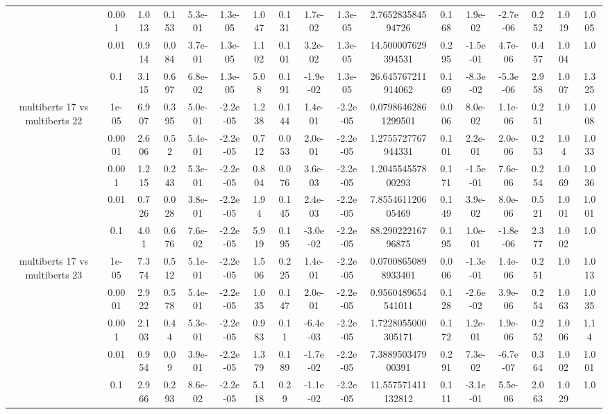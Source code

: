 \begin{tabular}{|c|c|c|c|c|c|c|c|c|c|c|c|c|c|c|c|c|}
 & 0.001 & 1.013 & 0.153 & 5.3e-01 & 1.3e-05 & 1.047 & 0.131 & 1.7e-02 & 1.3e-05 & 2.765283584594726 & 0.168 & 1.9e-02 & -2.7e-06 & 0.252 & 1.019 & 1.005 \\
 & 0.01 & 0.914 & 0.084 & 3.7e-01 & 1.3e-05 & 1.102 & 0.101 & 3.2e-02 & 1.3e-05 & 14.500007629394531 & 0.295 & -1.5e-01 & 4.7e-06 & 0.457 & 1.004 & 1.0 \\
 & 0.1 & 3.115 & 0.697 & 6.8e-02 & 1.3e-05 & 5.08 & 0.191 & -1.9e-02 & 1.3e-05 & 26.645767211914062 & 0.169 & -8.3e-02 & -5.3e-06 & 2.958 & 1.007 & 1.325 \\
\hline
\multirow{5}{*}{multiberts 17 vs multiberts 22} & 1e-05 & 6.907 & 0.395 & 5.0e-01 & -2.2e-05 & 1.238 & 0.144 & 1.4e-01 & -2.2e-05 & 0.07986462861299501 & 0.006 & 8.0e-02 & 1.1e-06 & 0.251 & 1.0 & 1.008 \\
 & 0.0001 & 2.606 & 0.52 & 5.4e-01 & -2.2e-05 & 0.712 & 0.053 & 2.0e-01 & -2.2e-05 & 1.2755727767944331 & 0.101 & 2.2e-01 & 2.0e-06 & 0.253 & 1.04 & 1.033 \\
 & 0.001 & 1.215 & 0.243 & 5.3e-01 & -2.2e-05 & 0.804 & 0.076 & 3.6e-03 & -2.2e-05 & 1.204554557800293 & 0.171 & -1.5e-01 & 7.6e-06 & 0.254 & 1.069 & 1.036 \\
 & 0.01 & 0.726 & 0.028 & 3.8e-01 & -2.2e-05 & 1.94 & 0.145 & 2.4e-03 & -2.2e-05 & 7.855461120605469 & 0.149 & 3.9e-02 & 8.0e-06 & 0.521 & 1.001 & 1.001 \\
 & 0.1 & 4.01 & 0.676 & 7.6e-02 & -2.2e-05 & 5.919 & 0.195 & -3.0e-02 & -2.2e-05 & 88.29022216796875 & 0.195 & 1.0e-01 & -1.8e-06 & 2.377 & 1.002 & 1.0 \\
\hline
\multirow{5}{*}{multiberts 17 vs multiberts 23} & 1e-05 & 7.374 & 0.512 & 5.1e-01 & -2.2e-05 & 1.506 & 0.225 & 1.4e-01 & -2.2e-05 & 0.07008650898933401 & 0.006 & -1.3e-01 & 1.4e-06 & 0.251 & 1.0 & 1.013 \\
 & 0.0001 & 2.922 & 0.578 & 5.4e-01 & -2.2e-05 & 1.035 & 0.147 & 2.0e-01 & -2.2e-05 & 0.9560489654541011 & 0.128 & -2.6e-02 & 3.9e-06 & 0.254 & 1.063 & 1.035 \\
 & 0.001 & 2.103 & 0.44 & 5.3e-01 & -2.2e-05 & 0.983 & 0.11 & -6.4e-03 & -2.2e-05 & 1.7228055000305171 & 0.172 & 1.2e-01 & 1.9e-06 & 0.252 & 1.006 & 1.14 \\
 & 0.01 & 0.954 & 0.09 & 3.9e-01 & -2.2e-05 & 1.379 & 0.189 & -1.7e-02 & -2.2e-05 & 7.388950347900391 & 0.291 & 7.3e-02 & -6.7e-07 & 0.364 & 1.002 & 1.001 \\
 & 0.1 & 2.966 & 0.293 & 8.6e-02 & -2.2e-05 & 5.118 & 0.29 & -1.1e-02 & -2.2e-05 & 11.557571411132812 & 0.111 & -3.1e-01 & 5.5e-06 & 2.063 & 1.029 & 1.0 \\

\end{tabular}
